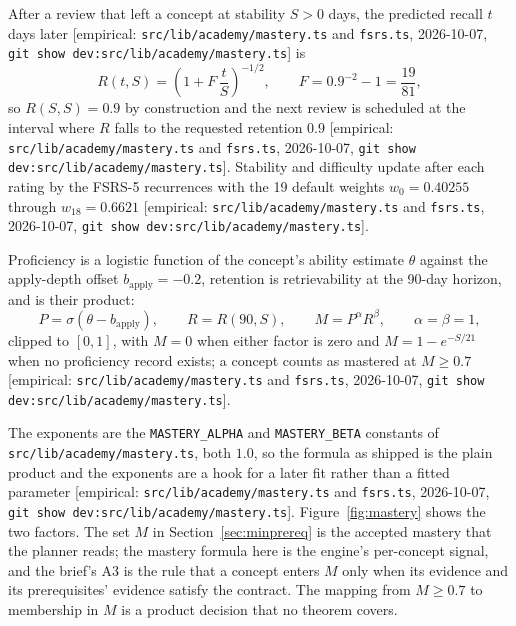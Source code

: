 \documentclass[11pt]{article}
\newcommand{\emp}[1]{\textcolor{bucketgray}{\footnotesize [empirical: #1]}}
\newcommand{\mast}{\emp{\texttt{src/\allowbreak lib/\allowbreak academy/\allowbreak mastery.\allowbreak ts} and \texttt{fsrs.\allowbreak ts}, 2026-10-07, \texttt{git show dev:src/\allowbreak lib/\allowbreak academy/\allowbreak mastery.\allowbreak ts}}}
\begin{document}
\begin{definition}
\label{def:fsrs}
After a review that left a concept at stability $S > 0$ days, the predicted recall $t$ days later \mast{} is
\begin{equation}
  R(t, S) = \left(1 + F\,\frac{t}{S}\right)^{-1/2}, \qquad F = 0.9^{-2} - 1 = \frac{19}{81},
  \label{eq:fsrs}
\end{equation}
so $R(S, S) = 0.9$ by construction and the next review is scheduled at the interval where $R$ falls to the requested retention $0.9$ \mast. Stability and difficulty update after each rating by the FSRS-5 recurrences with the 19 default weights $w_0 = 0.40255$ through $w_{18} = 0.6621$ \mast.
\end{definition}

\begin{definition}[Mastery]
\label{def:mastery}
Proficiency is a logistic function of the concept's ability estimate $\theta$ against the apply-depth offset $b_{\mathrm{apply}} = -0.2$, retention is retrievability at the 90-day horizon, and  is their product:
\begin{equation}
  P = \sigma(\theta - b_{\mathrm{apply}}), \qquad R = R(90, S), \qquad M = P^{\alpha} R^{\beta}, \qquad \alpha = \beta = 1,
  \label{eq:mastery}
\end{equation}
clipped to $[0, 1]$, with $M = 0$ when either factor is zero and $M = 1 - e^{-S/21}$ when no proficiency record exists; a concept counts as mastered at $M \geq 0.7$ \mast.
\end{definition}

The exponents are the \texttt{MASTERY\_ALPHA} and \texttt{MASTERY\_BETA} constants of \texttt{src/\allowbreak lib/\allowbreak academy/\allowbreak mastery.ts}, both $1.0$, so the formula as shipped is the plain product and the exponents are a hook for a later fit rather than a fitted parameter \mast. Figure~\ref{fig:mastery} shows the two factors. The set $M$ in Section~\ref{sec:minprereq} is the accepted mastery that the planner reads; the mastery formula here is the engine's per-concept signal, and the brief's A3 is the rule that a concept enters $M$ only when its evidence and its prerequisites' evidence satisfy the contract. The mapping from $M \geq 0.7$ to membership in $M$ is a product decision that no theorem covers.
\end{document}
